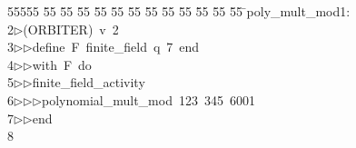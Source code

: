%
%
\begin{tabbing}
55555 \= 55 \= 55 \= 55 \= 55 \= 55 \= 55 \= 55 \= 55 \= 55 \= 55 \= 55 \= 55 \= \>poly\_mult\_mod1:\\[0pt]
2\>$\triangleright$\>(ORBITER)\ v\ 2\ \\[0pt]
3\>$\triangleright$\>$\triangleright$\>define\ F\ finite\_field\ q\ 7\ end\ \\[0pt]
4\>$\triangleright$\>$\triangleright$\>with\ F\ do\ \\[0pt]
5\>$\triangleright$\>$\triangleright$\>finite\_field\_activity\ \\[0pt]
6\>$\triangleright$\>$\triangleright$\>$\triangleright$\>polynomial\_mult\_mod\ 123\ 345\ 6001\ \\[0pt]
7\>$\triangleright$\>$\triangleright$\>end\\[0pt]
8\>\end{tabbing}
